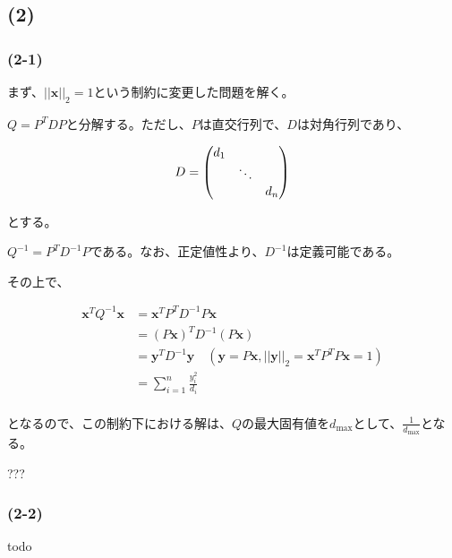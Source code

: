 \documentclass[a4paper, 10pt, dvipdfmx]{jlreq}
\begin{document}
\subsection*{(2)}

\subsubsection*{(2-1)}

まず、$||\bm{x}||_2=1$という制約に変更した問題を解く。

$Q=P^TDP$と分解する。ただし、$P$は直交行列で、$D$は対角行列であり、

\begin{align*}
  D=\mqty(d_1 &  & \\ & \ddots & \\ & & d_n)
\end{align*}

とする。

$Q^{-1}=P^TD^{-1}P$である。なお、正定値性より、$D^{-1}$は定義可能である。

その上で、

\begin{align*}
  \bm{x}^TQ^{-1}\bm{x} & = \bm{x}^TP^TD^{-1}P\bm{x}                                                      \\
                       & = (P\bm{x})^TD^{-1}(P\bm{x})                                                    \\
                       & = \bm{y}^TD^{-1}\bm{y} \quad (\bm{y}=P\bm{x},||\bm{y}||_2=\bm{x}^TP^TP\bm{x}=1) \\
                       & = \sum_{i=1}^{n}\frac{y_i^2}{d_i}                                               \\
\end{align*}

となるので、この制約下における解は、$Q$の最大固有値を$d_{\text{max}}$として、$\frac{1}{d_{\text{max}}}$となる。

???

\subsubsection*{(2-2)}

todo
\end{document}
